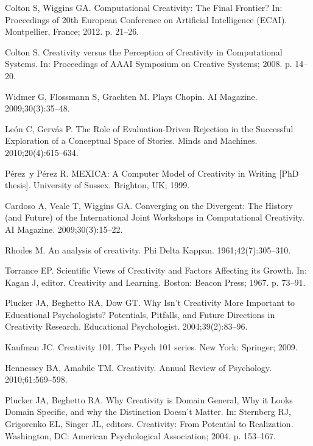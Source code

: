 \documentclass[10pt,letterpaper]{article}
\begin{document}
\begin{thebibliography}{10}

Colton S, Wiggins GA.
\newblock Computational Creativity: The Final Frontier?
\newblock In: Proceedings of 20th European Conference on Artificial
  Intelligence (ECAI). Montpellier, France; 2012. p. 21--26.

Colton S.
\newblock Creativity versus the Perception of Creativity in Computational
  Systems.
\newblock In: Proceedings of AAAI Symposium on Creative Systems; 2008. p.
  14--20.

Widmer G, Flossmann S, Grachten M.
 Plays {Chopin}.
\newblock AI Magazine. {2009};{30}({3}):35--48.

Le\'on C, Gerv\'as P.
\newblock The Role of Evaluation-Driven Rejection in the Successful Exploration
  of a Conceptual Space of Stories.
\newblock Minds and Machines. 2010;20(4):615--634.

P\'erez~y P\'erez R.
\newblock MEXICA: A Computer Model of Creativity in Writing [PhD thesis].
\newblock University of Sussex. Brighton, UK; 1999.

Cardoso A, Veale T, Wiggins GA.
\newblock Converging on the Divergent: The History (and Future) of the
  International Joint Workshops in Computational Creativity.
\newblock AI Magazine. 2009;30(3):15--22.

Rhodes M.
\newblock An analysis of creativity.
\newblock Phi Delta Kappan. 1961;42(7):305--310.

Torrance EP.
\newblock Scientific Views of Creativity and Factors Affecting its Growth.
\newblock In: Kagan J, editor. Creativity and Learning. Boston: Beacon Press;
  1967. p. 73--91.

Plucker JA, Beghetto RA, Dow GT.
\newblock Why Isn't Creativity More Important to Educational Psychologists?
  {Potentials}, Pitfalls, and Future Directions in Creativity Research.
\newblock Educational Psychologist. 2004;39(2):83--96.

Kaufman JC.
\newblock Creativity 101.
\newblock The Psych 101 series. New York: Springer; 2009.

Hennessey BA, Amabile TM.
\newblock Creativity.
\newblock Annual Review of Psychology. 2010;61:569--598.

Plucker JA, Beghetto RA.
\newblock Why Creativity is Domain General, Why it Looks Domain Specific, and
  why the Distinction Doesn't Matter.
\newblock In: Sternberg RJ, Grigorenko EL, Singer JL, editors. Creativity: From
  Potential to Realization. Washington, DC: American Psychological Association;
  2004. p. 153--167.


\end{thebibliography}
\end{document}
